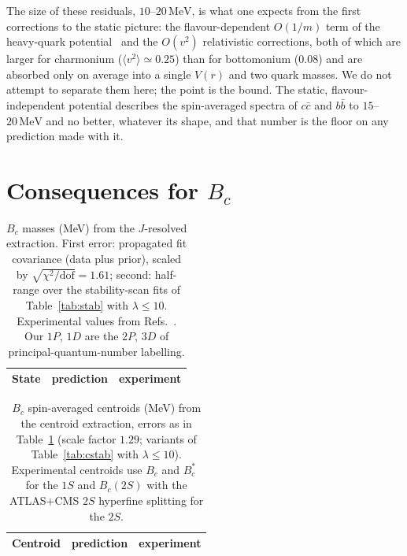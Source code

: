 \documentclass[10pt,twocolumn]{article}
\newcommand{\Bc}{B_c}
\newcommand{\Bcs}{B_c^*}
\newcommand{\cc}{c\bar c}
\newcommand{\bb}{b\bar b}
\newcommand{\MeV}{\,\mathrm{MeV}}
\begin{document}
The size of these residuals, $10$--$20\MeV$, is what one expects from the first corrections to the static picture: the flavour-dependent $O(1/m)$ term of the heavy-quark potential~\cite{Brambilla2001} and the $O(v^2)$ relativistic corrections, both of which are larger for charmonium ($\langle v^2\rangle\simeq0.25$) than for bottomonium ($0.08$) and are absorbed only on average into a single $V(r)$ and two quark masses.
We do not attempt to separate them here; the point is the bound.
The static, flavour-independent potential describes the spin-averaged spectra of $\cc$ and $\bb$ to $15$--$20\MeV$ and no better, whatever its shape, and that number is the floor on any prediction made with it.

\section{Consequences for $\Bc$}
\label{sec:bc}

\begin{table}[t]
\caption{$\Bc$ masses (MeV) from the $J$-resolved extraction. First error: propagated fit covariance (data plus prior), scaled by $\sqrt{\chi^2/\mathrm{dof}}=1.61$; second: half-range over the stability-scan fits of Table~\ref{tab:stab} with $\lambda\le10$. Experimental values from Refs.~\cite{PDG2026,ATLAS2026,CMS2019}. Our $1P$, $1D$ are the $2P$, $3D$ of principal-quantum-number labelling.}
\label{tab:bc}
\centering\small
\begin{tabular}{lcc}
\toprule
State & prediction & experiment \\
\midrule

\end{tabular}
\end{table}

\begin{table}[t]
\caption{$\Bc$ spin-averaged centroids (MeV) from the centroid extraction, errors as in Table~\ref{tab:bc} (scale factor $1.29$; variants of Table~\ref{tab:cstab} with $\lambda\le10$). Experimental centroids use $\Bc$ and $\Bcs$~\cite{PDG2026,ATLAS2026} for the $1S$ and $\Bc(2S)$ with the ATLAS$+$CMS $2S$ hyperfine splitting for the $2S$.}
\label{tab:cbc}
\centering\small
\begin{tabular}{lcc}
\toprule
Centroid & prediction & experiment \\
\midrule

\end{tabular}
\end{table}
\end{document}
